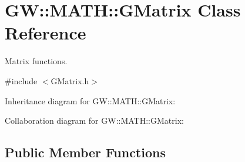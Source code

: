 \hypertarget{classGW_1_1MATH_1_1GMatrix}{}\section{GW\+:\+:M\+A\+TH\+:\+:G\+Matrix Class Reference}
\label{classGW_1_1MATH_1_1GMatrix}


Matrix functions.  




{\ttfamily \#include $<$G\+Matrix.\+h$>$}



Inheritance diagram for GW\+:\+:M\+A\+TH\+:\+:G\+Matrix\+:


Collaboration diagram for GW\+:\+:M\+A\+TH\+:\+:G\+Matrix\+:
\subsection*{Public Member Functions}
